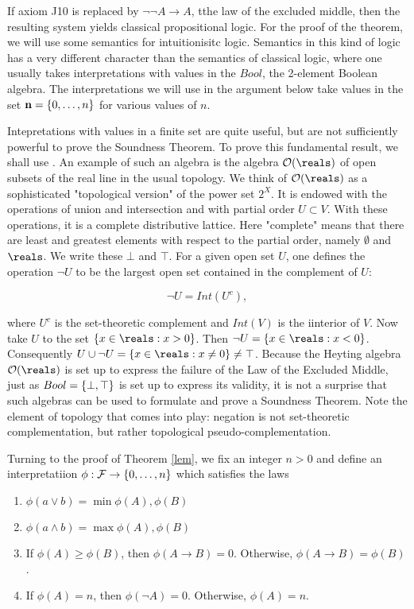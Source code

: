 If axiom J10 is replaced by $\neg \neg A \to A$, tthe law of the excluded middle, then the resulting system yields classical propositional logic.
For the proof of the theorem, we will use some semantics for intuitionisitc logic.  Semantics in this kind of logic has a very different character than the semantics of classical logic, where one usually takes interpretations with values in the $Bool$, the 2-element Boolean algebra.  The interpretations we will use in the argument below take values in the set  $\mathbf{n} = \{ 0, \ldots, n \}$ for various values of $n$.

Intepretations with values in a finite set are quite useful, but are not sufficiently powerful to prove the Soundness Theorem. To prove this fundamental result, we shall use .  An example of such an algebra is the algebra $\opensets(\reals)$ of open subsets of the real line in the usual topology.  We think of $\opensets(\reals)$ as a sophisticated "topological version" of the power set $2^X$. It is endowed with the operations of union and intersection and with partial order $U \subset V$.  With these operations, it is a complete distributive lattice. Here "complete" means that there are least and greatest elements with respect to the partial order, namely $\emptyset$ and $\reals$.  We write these $\bot$ and $\top$. For a given open set $U$, one defines the operation $\neg U$ to be the largest open set contained in the complement of $U$:

$$
\neg U = Int(U^c),
$$

where $U^c$ is the set-theoretic complement and $Int(V)$ is the iinterior of $V$.
  Now take $U$ to the set $\set{ x \in \reals :  x > 0}$.  Then $\neg U = \set{ x \in \reals :  x < 0}$.    Consequently $U \cup \neg U = \set{x \in \reals : x \ne 0} \ne \top$.  Because the Heyting algebra $\opensets(\reals)$ is set up to express the failure of the Law of the Excluded Middle, just as $Bool = \{ \bot, \top \}$ is set up to express its validity, it is not a surprise that such algebras can be used to formulate and prove a Soundness Theorem.  Note the element of topology that comes into play: negation is not set-theoretic complementation, but rather topological pseudo-complementation.

Turning to the proof of Theorem \ref{lem},  we fix an integer $n > 0$ and define an interpretatiion $\phi: \mathcal{F} \to \{ 0, \ldots, n \}$ which satisfies the laws


\begin{enumerate}

\item $\phi(a \lor b) = \min \phi(A), \phi(B)$

\item  $\phi(a \land b) = \max \phi(A), \phi(B)$

\item If $\phi(A) \ge \phi(B)$, then $\phi(A \to B) = 0$.  Otherwise,
$\phi(A \to B) = \phi(B)$.

\item If $\phi(A) = n$, then $\phi(\neg A) = 0$.  Otherwise, $\phi(A) = n$.

\end{enumerate}

